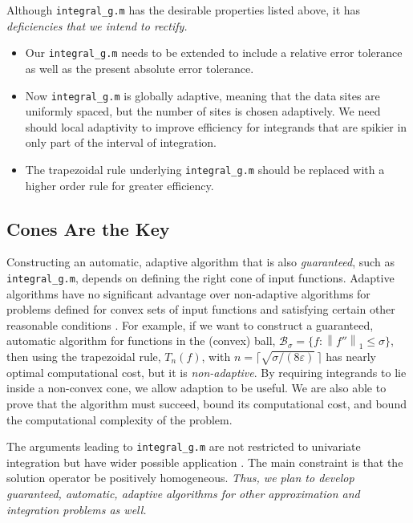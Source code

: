 \documentclass[11pt]{NSFamsart}
\newcommand{\cb}{\mathcal{B}}
\newcommand{\norm}[2][{}]{\ensuremath{\left \lVert #2 \right \rVert}_{#1}}
\begin{document}
\begin{description}[leftmargin=2.5ex]
Although {\tt integral\_g.m} has the desirable properties listed above, it has \emph{deficiencies that we intend to rectify.}
\begin{itemize}[leftmargin=2.5ex]
\item Our {\tt integral\_g.m} needs to be extended to include a relative error tolerance as well as the present absolute error tolerance.

\item Now {\tt integral\_g.m} is globally adaptive, meaning that the data sites are uniformly spaced, but the number of sites is chosen adaptively.  We need should local adaptivity to improve efficiency for integrands that are spikier in only part of the interval of integration.

\item The trapezoidal rule underlying {\tt integral\_g.m} should be replaced with a higher order rule for greater efficiency.
\end{itemize}

\subsection{Cones Are the Key}
Constructing an automatic, adaptive algorithm that is also \emph{guaranteed}, such as {\tt integral\_g.m}, depends on defining the right cone of input functions.  Adaptive algorithms have no significant advantage over non-adaptive algorithms for problems defined for convex sets of input functions and satisfying certain other reasonable conditions \cite[Chapter 4, Theorem 5.2.1]{TraWasWoz88}. For example, if we want to construct a guaranteed, automatic algorithm for functions in the (convex) ball, $\cb_{\sigma} = \{f : \norm[1]{f''} \le \sigma \}$, then using the trapezoidal rule, $T_n(f)$, with $n=\bigl\lceil\sqrt{\sigma/(8 \varepsilon)}\, \bigr \rceil$ has nearly optimal computational cost, but it is \emph{non-adaptive}.  By requiring integrands to lie inside a non-convex cone, we allow adaption to be useful. We are also able to prove that the algorithm must succeed, bound its computational cost, and bound the computational complexity of the problem.

The arguments leading to {\tt integral\_g.m} are not restricted to univariate integration but have wider possible application \citep{HicEtal14b}.  The main constraint is that the solution operator be positively homogeneous.  \emph{Thus, we plan to develop guaranteed, automatic, adaptive algorithms for other approximation and integration problems as well.}


\end{description}
\end{document}
